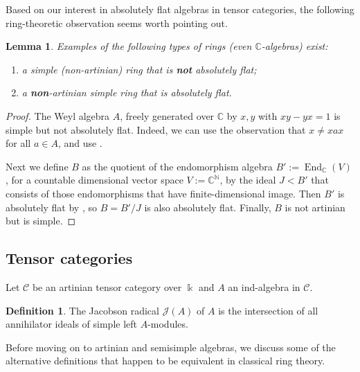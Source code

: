 \documentclass[11pt]{amsart}
\def\End{\operatorname{End}}
\def\JJ{\mathcal{J}}
\def\cC{\mathscr{C}}
\def\bk{\Bbbk}
\def\mN{\mathbb{N}}
\newtheorem{lemma}[thm]{Lemma}
\theoremstyle{definition}
\newtheorem{definition}[thm]{Definition}
\theoremstyle{remark}
\numberwithin{equation}{section}
\newcommand{\mC}{\mathbb{C}}
\begin{document}
Based on our interest in absolutely flat algebras in tensor categories, the following ring-theoretic observation seems worth pointing out.
\begin{lemma}\label{prop:exam-ring}
Examples of the following types of rings (even $\mC$-algebras) exist:
\begin{enumerate}
    \item a simple (non-artinian) ring that is {\bf not} absolutely flat;
\item a {\bf non}-artinian simple ring that is absolutely flat.
\end{enumerate}
\end{lemma}
\begin{proof}
    
    The Weyl algebra $A$, freely generated over $\mC$ by $x,y$ with $xy-yx=1$ is simple but not absolutely flat. Indeed, we can use the observation that $x\not=xax$ for all $a\in A$, and use \cite[Theorem~4.23]{Lam}.

    Next we define $B$ as the quotient of the endomorphism algebra $B':=\End_{\mC}(V)$, for a countable dimensional vector space $V:= \mC^{\mN}$, by the ideal $J<B'$ that consists of those endomorphisms that have finite-dimensional image. Then $B'$ is absolutely flat by \cite[Proposition~4.27]{Lam}, so $B=B'/J$ is also absolutely flat. Finally, $B$ is not artinian but is simple. 
\end{proof}




\subsection{Tensor categories}




Let $\cC$ be an artinian tensor category over $\bk$ and $A$ an ind-algebra in $\cC$.


\begin{definition}
    The Jacobson radical $\JJ(A)$ of $A$ is the intersection of all annihilator ideals of simple left $A$-modules.
\end{definition}

Before moving on to artinian and semisimple algebras, we discuss some of the alternative definitions that happen to be equivalent in classical ring theory.
\end{document}
